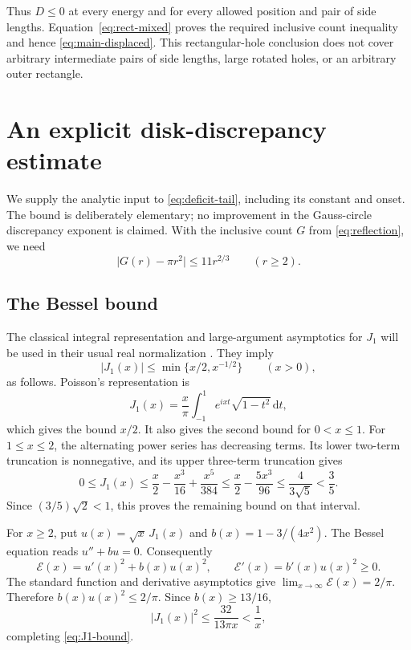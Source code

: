 \documentclass[11pt,reqno]{amsart}
\numberwithin{equation}{section}
\newcommand{\dd}{\,\mathrm d}
\newcommand{\abs}[1]{\lvert#1\rvert}
\begin{document}
Thus $D\le0$ at every energy and for every allowed position
and pair of side lengths. Equation~\eqref{eq:rect-mixed}
proves the required inclusive count inequality and hence
\eqref{eq:main-displaced}. This rectangular-hole conclusion does not cover
arbitrary intermediate pairs of side lengths,
large rotated holes, or an arbitrary outer rectangle.

\appendix
\section{An explicit disk-discrepancy estimate}\label{app:circle}

We supply the analytic input to \eqref{eq:deficit-tail}, including
its constant and onset. The bound is deliberately elementary;
no improvement in the Gauss-circle discrepancy exponent is claimed.
With the inclusive count $G$ from \eqref{eq:reflection}, we need
\begin{equation}\label{eq:gauss}
 \abs{G(r)-\pi r^2}\le11r^{2/3}\qquad(r\ge2).
\end{equation}

\subsection*{The Bessel bound}

The classical integral representation and large-argument
asymptotics for $J_1$ will be used in their usual real
normalization \cite[\S\S10.9, 10.17]{DLMF}. They imply
\begin{equation}\label{eq:J1-bound}
 \abs{J_1(x)}\le\min\{x/2,x^{-1/2}\}\qquad(x>0),
\end{equation}
as follows. Poisson's representation is
\[
 J_1(x)=\frac{x}{\pi}\int_{-1}^{1}e^{ixt}\sqrt{1-t^2}\dd t,
\]
which gives the bound $x/2$. It also gives the second bound
for $0<x\le1$. For $1\le x\le2$, the alternating power
series has decreasing terms. Its lower two-term truncation
is nonnegative, and its upper three-term truncation gives
\[
 0\le J_1(x)\le\frac x2-\frac{x^3}{16}+\frac{x^5}{384}
 \le\frac x2-\frac{5x^3}{96}
 \le\frac4{3\sqrt5}<\frac35.
\]
Since $(3/5)\sqrt2<1$, this proves the remaining bound on
that interval.

For $x\ge2$, put $u(x)=\sqrt x\,J_1(x)$ and
$b(x)=1-3/(4x^2)$. The Bessel equation reads $u''+bu=0$.
Consequently
\[
 \mathcal E(x)=u'(x)^2+b(x)u(x)^2,
 \qquad\mathcal E'(x)=b'(x)u(x)^2\ge0.
\]
The standard function and derivative asymptotics give
$\lim_{x\to\infty}\mathcal E(x)=2/\pi$. Therefore
$b(x)u(x)^2\le2/\pi$. Since $b(x)\ge13/16$,
\[
 \abs{J_1(x)}^2\le\frac{32}{13\pi x}<\frac1x,
\]
completing \eqref{eq:J1-bound}.
\end{document}
